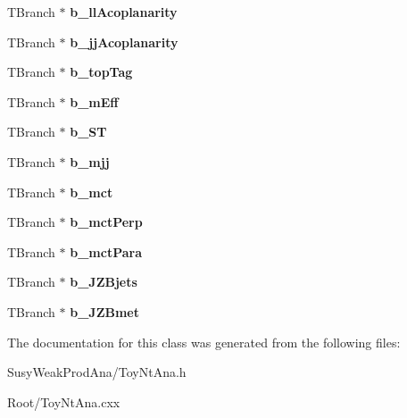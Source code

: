 \begin{DoxyCompactItemize}
\item 
\hypertarget{classToyNtAna_a0587bd98f4d4cfb9f975ac03f6a5fef1}{
TBranch $\ast$ {\bfseries b\_\-llAcoplanarity}}
\label{classToyNtAna_a0587bd98f4d4cfb9f975ac03f6a5fef1}

\item 
\hypertarget{classToyNtAna_a2339279d512639fce294600864c2634b}{
TBranch $\ast$ {\bfseries b\_\-jjAcoplanarity}}
\label{classToyNtAna_a2339279d512639fce294600864c2634b}

\item 
\hypertarget{classToyNtAna_a0ec2f3c45ba0f118ae80e94c103f6741}{
TBranch $\ast$ {\bfseries b\_\-topTag}}
\label{classToyNtAna_a0ec2f3c45ba0f118ae80e94c103f6741}

\item 
\hypertarget{classToyNtAna_ae62aacbf7df3e2e0f9e784ba6d25800e}{
TBranch $\ast$ {\bfseries b\_\-mEff}}
\label{classToyNtAna_ae62aacbf7df3e2e0f9e784ba6d25800e}

\item 
\hypertarget{classToyNtAna_ae43cd0e668eef665ddb00c0c7f94f46e}{
TBranch $\ast$ {\bfseries b\_\-ST}}
\label{classToyNtAna_ae43cd0e668eef665ddb00c0c7f94f46e}

\item 
\hypertarget{classToyNtAna_a6bc6e38ba7d778d84657cef7a7ec06d1}{
TBranch $\ast$ {\bfseries b\_\-mjj}}
\label{classToyNtAna_a6bc6e38ba7d778d84657cef7a7ec06d1}

\item 
\hypertarget{classToyNtAna_a97aac43312360e73c5e8e1d6ae486784}{
TBranch $\ast$ {\bfseries b\_\-mct}}
\label{classToyNtAna_a97aac43312360e73c5e8e1d6ae486784}

\item 
\hypertarget{classToyNtAna_aa3ce3048f27ef10d62d28fa30bf79e5a}{
TBranch $\ast$ {\bfseries b\_\-mctPerp}}
\label{classToyNtAna_aa3ce3048f27ef10d62d28fa30bf79e5a}

\item 
\hypertarget{classToyNtAna_afcc9eecf4994370395a67db53cd5cb1f}{
TBranch $\ast$ {\bfseries b\_\-mctPara}}
\label{classToyNtAna_afcc9eecf4994370395a67db53cd5cb1f}

\item 
\hypertarget{classToyNtAna_aa9a213d91840c30b216f69456eca3aa8}{
TBranch $\ast$ {\bfseries b\_\-JZBjets}}
\label{classToyNtAna_aa9a213d91840c30b216f69456eca3aa8}

\item 
\hypertarget{classToyNtAna_a6498711e97f6f244220b59bff9c738af}{
TBranch $\ast$ {\bfseries b\_\-JZBmet}}
\label{classToyNtAna_a6498711e97f6f244220b59bff9c738af}

\end{DoxyCompactItemize}


The documentation for this class was generated from the following files:\begin{DoxyCompactItemize}
\item 
SusyWeakProdAna/ToyNtAna.h\item 
Root/ToyNtAna.cxx\end{DoxyCompactItemize}
